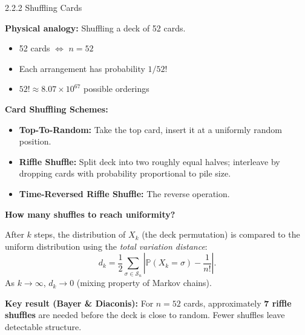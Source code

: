\documentclass[aspectratio=169,10pt]{beamer}
\begin{document}
\begin{frame}[allowframebreaks]{2.2.2 Shuffling Cards}

\textbf{Physical analogy:} Shuffling a deck of 52 cards.
\begin{itemize}
  \item 52 cards $\Leftrightarrow$ $n = 52$
  \item Each arrangement has probability $1/52!$
  \item $52! \approx 8.07 \times 10^{67}$ possible orderings
\end{itemize}

\medskip
\textbf{Card Shuffling Schemes:}
\begin{itemize}
  \item \textbf{Top-To-Random:} Take the top card, insert it at a uniformly random position.
  \item \textbf{Riffle Shuffle:} Split deck into two roughly equal halves; interleave by
    dropping cards with probability proportional to pile size.
  \item \textbf{Time-Reversed Riffle Shuffle:} The reverse operation.
\end{itemize}

\framebreak

\textbf{How many shuffles to reach uniformity?}

After $k$ steps, the distribution of $X_k$ (the deck permutation) is compared to
the uniform distribution using the \emph{total variation distance}:
\[
  d_k = \frac{1}{2} \sum_{\sigma \in \mathcal{S}_n}
        \left|\mathbb{P}(X_k = \sigma) - \frac{1}{n!}\right|.
\]
As $k \to \infty$, $d_k \to 0$ (mixing property of Markov chains).

\medskip
\textbf{Key result (Bayer \& Diaconis):} For $n=52$ cards, approximately
\textbf{7 riffle shuffles} are needed before the deck is close to random.
Fewer shuffles leave detectable structure.

\end{frame}
\end{document}
